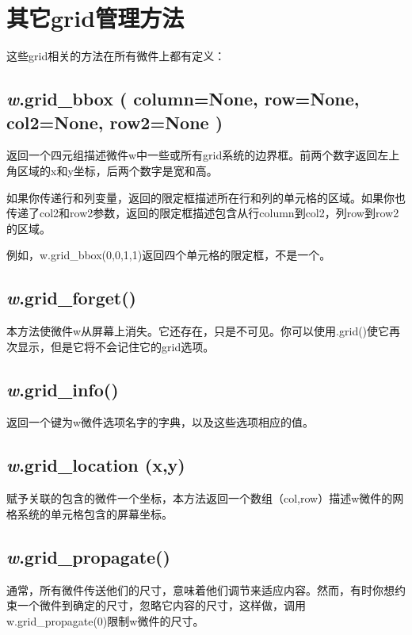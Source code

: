 \documentclass[11pt,a4paper,oneside]{book}
\begin{document}
\section[其它grid管理方法]{其它grid管理方法}%
这些grid相关的方法在所有微件上都有定义：
\subsection*{\textsf{\textit{w}.grid\_bbox ( column=None, row=None, col2=None, row2=None )}}
\par{返回一个四元组描述微件w中一些或所有grid系统的边界框。前两个数字返回左上角区域的x和y坐标，后两个数字是宽和高。}
\par{如果你传递行和列变量，返回的限定框描述所在行和列的单元格的区域。如果你也传递了col2和row2参数，返回的限定框描述包含从行column到col2，列row到row2的区域。}
\par{例如，w.grid\_bbox(0,0,1,1)返回四个单元格的限定框，不是一个。}

\subsection*{\textsf{\textit{w}.grid\_forget()}}
\par{本方法使微件w从屏幕上消失。它还存在，只是不可见。你可以使用.grid()使它再次显示，但是它将不会记住它的grid选项。}

\subsection*{\textsf{\textit{w}.grid\_info()}}
\par{返回一个键为w微件选项名字的字典，以及这些选项相应的值。}

\subsection*{\textsf{\textit{w}.grid\_location (x,y)}}
\par{赋予关联的包含的微件一个坐标，本方法返回一个数组（col,row）描述w微件的网格系统的单元格包含的屏幕坐标。}

\subsection*{\textsf{\textit{w}.grid\_propagate()}}
\par{通常，所有微件传送他们的尺寸，意味着他们调节来适应内容。然而，有时你想约束一个微件到确定的尺寸，忽略它内容的尺寸，这样做，调用w.grid\_propagate(0)限制w微件的尺寸。}
\end{document}
